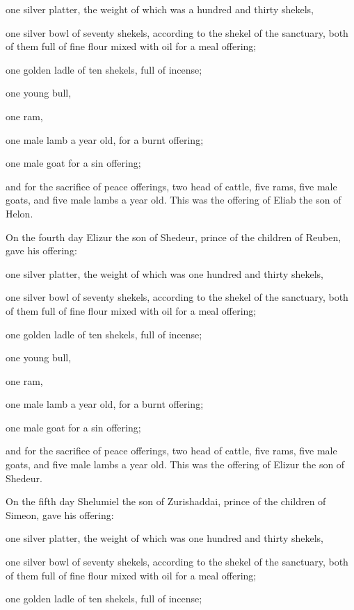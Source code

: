 one silver platter, the weight of which was a hundred and thirty
shekels,

one silver bowl of seventy shekels, according to the shekel of the
sanctuary, both of them full of fine flour mixed with oil for a meal
offering;

 one golden ladle of ten shekels, full of incense;

 one young bull,

one ram,

one male lamb a year old, for a burnt offering;

 one male goat for a sin offering;

 and for the sacrifice of peace offerings, two head of
cattle, five rams, five male goats, and five male lambs a year old. This
was the offering of Eliab the son of Helon.

 On the fourth day Elizur the son of Shedeur, prince of
the children of Reuben,  gave his offering:

one silver platter, the weight of which was one hundred and thirty
shekels,

one silver bowl of seventy shekels, according to the shekel of the
sanctuary, both of them full of fine flour mixed with oil for a meal
offering;

 one golden ladle of ten shekels, full of incense;

 one young bull,

one ram,

one male lamb a year old, for a burnt offering;

 one male goat for a sin offering;

 and for the sacrifice of peace offerings, two head of
cattle, five rams, five male goats, and five male lambs a year old. This
was the offering of Elizur the son of Shedeur.

 On the fifth day Shelumiel the son of Zurishaddai,
prince of the children of Simeon,  gave his offering:

one silver platter, the weight of which was one hundred and thirty
shekels,

one silver bowl of seventy shekels, according to the shekel of the
sanctuary, both of them full of fine flour mixed with oil for a meal
offering;

 one golden ladle of ten shekels, full of incense;

